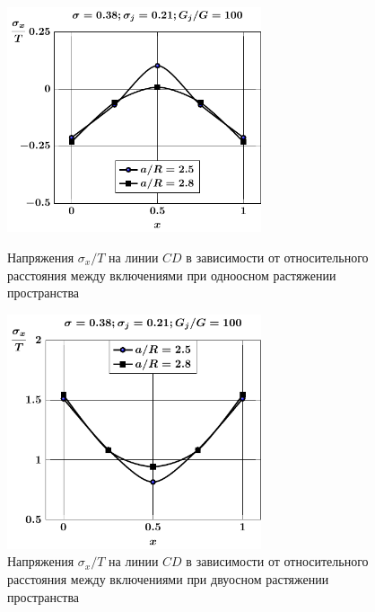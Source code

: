 \begin{figure}[h!]
\centering\footnotesize
\parbox[b]{7.5cm}{\centering\includegraphics[width=7.5cm]{inc13-a-d95-g100-t1-sig_x-cd.pdf}
\caption{Напряжения $\sigma_x/T$ на линии  $CD$ в зависимости от относительного расстояния между включениями при одноосном растяжении пространства
\label{f:8:78}}}\hfil\hfil
\parbox[b]{7.5cm}{\centering\includegraphics[width=7.5cm]{inc13-a-d95-g100-t2-sig_x-cd.pdf}
\caption{Напряжения $\sigma_x/T$ на линии  $CD$ в зависимости от относительного расстояния между включениями при двуосном растяжении пространства
\label{f:8:79}}}
\end{figure}

